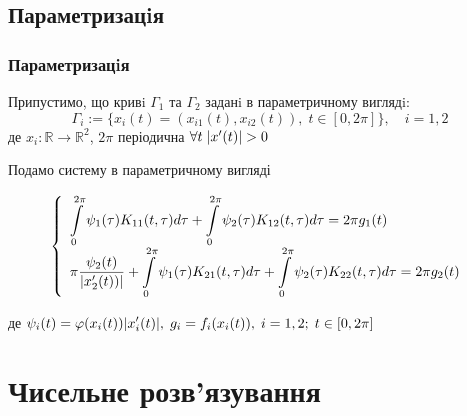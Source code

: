 \documentclass{beamer}
\numberwithin{equation}{section}
\newcommand{\intl}{\int\limits}
\newcommand{\inttwopi}{\intl_{0}^{2\pi}}
\begin{document}
	\subsection{Параметризацiя} 

	\begin{frame}
		\frametitle{Параметризацiя}
		Припустимо, що кривi $\Gamma_{1}$ та $\Gamma_{2}$ заданi в параметричному виглядi:
		\begin{equation}
			\Gamma_{i} := \{ x_{i}(t) = (x_{i1}(t), x_{i2}(t)), \; t \in [ 0, 2\pi ] \} , \quad i = 1, 2
		\end{equation}
		\indent де $x_{i} : \mathbb{R} \rightarrow \mathbb{R}^2$, $2\pi$ періодична $\forall{t} \; \abs{x'(t)} > 0$ 
		
		Подамо систему в параметричному вигляді
		\begin{small}
			\begin{equation}
				\label{IE-parametrized-system}
				\left\{
				\begin{array}{l}
					\displaystyle
					\inttwopi \psi_1(\tau) K_{11}(t, \tau) d \tau
					+ \inttwopi  \psi_2(\tau) K_{12}(t, \tau) d \tau
					= 2\pi g_{1}(t)
					\\ [0.3cm]
					\displaystyle
					 \pi \frac{\psi_2(t)}{\abs{x'_{2}(t))}}
					+ \inttwopi \psi_1(\tau) K_{21}(t, \tau) d \tau
					+ \inttwopi  \psi_2(\tau) K_{22}(t, \tau) d \tau
					= 2\pi g_{2}(t)
				\end{array}\right.
			\end{equation}
		
		де $\displaystyle \psi_{i}(t) = \varphi(x_{i}(t)) \abs{x'_{i}(t)}, \; g_{i} = f_{i}(x_{i}(t)), \;  i  = 1, 2; \; t \in [0, 2\pi]$ \\[0.3cm]
		
		\end{small}
	\end{frame}
	
		

	


	\section{Чисельне розв'язування} 
\end{document}
